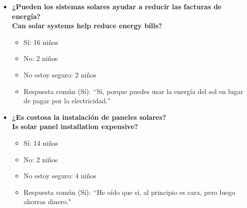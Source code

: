 \documentclass[12pt]{article}
\begin{document}
\begin{itemize}
      \item \textbf{¿Pueden los sistemas solares ayudar a reducir las facturas de energía?}\\
            \textbf{Can solar systems help reduce energy bills?}
            \begin{itemize}
                  \item Sí: 16 niños
                  \item No: 2 niños
                  \item No estoy seguro: 2 niños
                  \item Respuesta común (Sí): \lq\lq Sí, porque puedes usar la energía del sol en lugar de pagar por la electricidad."
            \end{itemize}
            \begin{minipage}{\linewidth}
                  \centering
                  \begin{minipage}{0.5\linewidth}
                  \end{minipage}%
            \end{minipage}

      \item \textbf{¿Es costosa la instalación de paneles solares?}\\
            \textbf{Is solar panel installation expensive?}
            \begin{itemize}
                  \item Sí: 14 niños
                  \item No: 2 niños
                  \item No estoy seguro: 4 niños
                  \item Respuesta común (Sí): \lq\lq He oído que sí, al principio es cara, pero luego ahorras dinero."
            \end{itemize}
            \begin{minipage}{\linewidth}
                  \centering
                  \begin{minipage}{0.5\linewidth}
                  \end{minipage}%
            \end{minipage}


\end{itemize}
\end{document}
